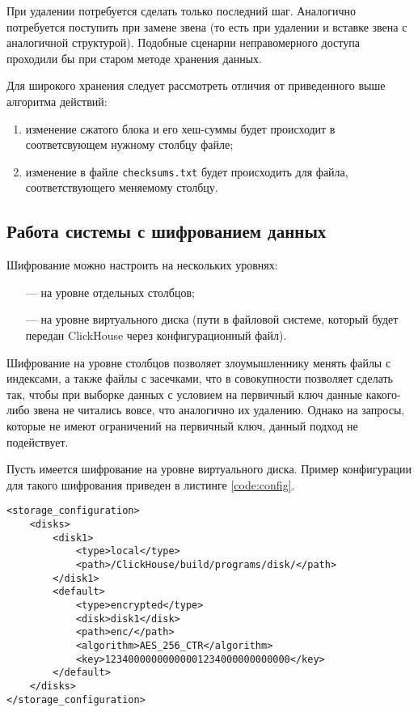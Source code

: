 При удалении потребуется сделать только последний шаг. Аналогично потребуется поступить при замене звена (то есть при удалении и вставке звена с аналогичной структурой). Подобные сценарии неправомерного доступа проходили бы при старом методе хранения данных.

Для широкого хранения следует рассмотреть отличия от приведенного выше алгоритма действий:
\begin{enumerate}
    \item изменение сжатого блока и его хеш-суммы будет происходит в соответсвующем нужному столбцу файле;
    \item изменение в файле \texttt{checksums.txt} будет происходить для файла, соответствующего меняемому столбцу.
\end{enumerate}

\subsection{Работа системы с шифрованием данных}

Шифрование можно настроить на нескольких уровнях:
\begin{itemize}
    \item [---] на уровне отдельных столбцов;
    \item [---] на уровне виртуального диска (пути в файловой системе, который будет передан ClickHouse через конфигурационный файл).
\end{itemize}

Шифрование на уровне столбцов позволяет злоумышленнику менять файлы с индексами, а также файлы с засечками, что в совокупности позволяет сделать так, чтобы при выборке данных с условием на первичный ключ данные какого-либо звена не читались вовсе, что аналогично их удалению. Однако на запросы, которые не имеют ограничений на первичный ключ, данный подход не подействует.

Пусть имеется шифрование на уровне виртуального диска. Пример конфигурации для такого шифрования приведен в листинге \ref{code:config}.

\begin{lstlisting}[label=code:config, caption={Параметры конфигурации для шифрования на уровне диска.}]
<storage_configuration>
    <disks>
        <disk1>
            <type>local</type>
            <path>/ClickHouse/build/programs/disk/</path>
        </disk1>
        <default>
            <type>encrypted</type>
            <disk>disk1</disk>
            <path>enc/</path>
            <algorithm>AES_256_CTR</algorithm>
            <key>12340000000000001234000000000000</key>
        </default>
    </disks>
</storage_configuration>
\end{lstlisting}

